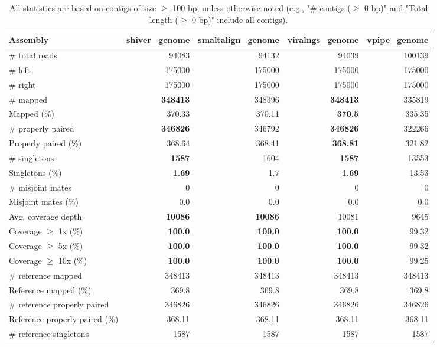 \documentclass[12pt,a4paper]{article}
\begin{document}
\begin{table}[ht]
\begin{center}
\caption{All statistics are based on contigs of size $\geq$ 100 bp, unless otherwise noted (e.g., "\# contigs ($\geq$ 0 bp)" and "Total length ($\geq$ 0 bp)" include all contigs).}
\begin{tabular}{|l*{4}{|r}|}
\hline
Assembly & shiver\_genome & smaltalign\_genome & viralngs\_genome & vpipe\_genome \\ \hline
\# total reads & 94083 & 94132 & 94039 & 100139 \\ \hline
\# left & 175000 & 175000 & 175000 & 175000 \\ \hline
\# right & 175000 & 175000 & 175000 & 175000 \\ \hline
\# mapped & {\bf 348413} & 348396 & {\bf 348413} & 335819 \\ \hline
Mapped (\%) & 370.33 & 370.11 & {\bf 370.5} & 335.35 \\ \hline
\# properly paired & {\bf 346826} & 346792 & {\bf 346826} & 322266 \\ \hline
Properly paired (\%) & 368.64 & 368.41 & {\bf 368.81} & 321.82 \\ \hline
\# singletons & {\bf 1587} & 1604 & {\bf 1587} & 13553 \\ \hline
Singletons (\%) & {\bf 1.69} & 1.7 & {\bf 1.69} & 13.53 \\ \hline
\# misjoint mates & 0 & 0 & 0 & 0 \\ \hline
Misjoint mates (\%) & 0.0 & 0.0 & 0.0 & 0.0 \\ \hline
Avg. coverage depth & {\bf 10086} & {\bf 10086} & 10081 & 9645 \\ \hline
Coverage $\geq$ 1x (\%) & {\bf 100.0} & {\bf 100.0} & {\bf 100.0} & 99.32 \\ \hline
Coverage $\geq$ 5x (\%) & {\bf 100.0} & {\bf 100.0} & {\bf 100.0} & 99.32 \\ \hline
Coverage $\geq$ 10x (\%) & {\bf 100.0} & {\bf 100.0} & {\bf 100.0} & 99.25 \\ \hline
\# reference mapped & 348413 & 348413 & 348413 & 348413 \\ \hline
Reference mapped (\%) & 369.8 & 369.8 & 369.8 & 369.8 \\ \hline
\# reference properly paired & 346826 & 346826 & 346826 & 346826 \\ \hline
Reference properly paired (\%) & 368.11 & 368.11 & 368.11 & 368.11 \\ \hline
\# reference singletons & 1587 & 1587 & 1587 & 1587 \\ \hline

\end{tabular}
\end{center}
\end{table}
\end{document}
